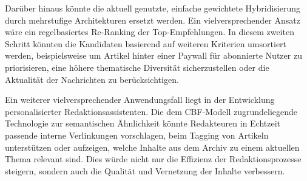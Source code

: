 Darüber hinaus könnte die aktuell genutzte, einfache gewichtete 
Hybridisierung durch mehrstufige Architekturen ersetzt werden. 
Ein vielversprechender Ansatz wäre ein regelbasiertes Re-Ranking der 
Top-Empfehlungen. In diesem zweiten Schritt könnten die Kandidaten basierend 
auf weiteren Kriterien umsortiert werden, beispielsweise um Artikel hinter einer 
Paywall für abonnierte Nutzer zu priorisieren, eine höhere thematische 
Diversität sicherzustellen oder die Aktualität der Nachrichten zu berücksichtigen.

Ein weiterer vielversprechender Anwendungsfall liegt in der Entwicklung 
personalisierter Redaktionsassistenten. Die dem \ac{CBF}-Modell zugrundeliegende 
Technologie zur semantischen Ähnlichkeit könnte Redakteuren in Echtzeit passende 
interne Verlinkungen vorschlagen, beim Tagging von Artikeln unterstützen 
oder aufzeigen, welche Inhalte aus dem Archiv zu einem aktuellen Thema relevant 
sind. Dies würde nicht nur die Effizienz der Redaktionsprozesse steigern, 
sondern auch die Qualität und Vernetzung der Inhalte verbessern.